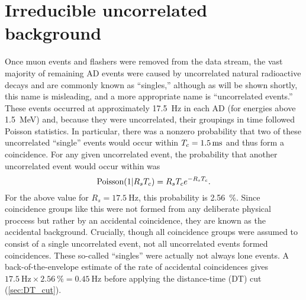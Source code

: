 
\section{Irreducible uncorrelated background}
\label{sec:acc}

Once muon events and flashers were removed from the data stream,
the vast majority of remaining AD events were caused by uncorrelated
natural radioactive decays and are commonly known as ``singles,''
although as will be shown shortly, this name is misleading,
and a more appropriate name is ``uncorrelated events.''
These events occurred at approximately \SI{17.5}{\hertz} in each AD
(for energies above \SI{1.5}{\MeV})
and,
because they were uncorrelated, their groupings in time followed Poisson statistics.
In particular, there was a nonzero probability that
two of these uncorrelated ``single'' events would occur within
$T_c=\SI{1.5}{\milli\second}$ and thus form a  coincidence.
For any given uncorrelated event, the probability that
another uncorrelated event would occur within \tc{} was
\begin{equation}
    \text{Poisson}(1\vert R_sT_c) = R_sT_c e^{-R_sT_c}.
\end{equation}
For the above value for $R_s=\SI{17.5}{\hertz}$, this probability is \SI{2.56}{\percent}.
Since  coincidence groups like this were not formed from any
deliberate physical proccess but rather by an accidental coincidence,
they are known as the accidental background.
Crucially, though all  coincidence groups
were assumed to consist of a single uncorrelated event,
not all uncorrelated events formed  coincidences.
These so-called ``singles'' were actually not always lone events.
A back-of-the-envelope estimate of the rate of accidental coincidences gives
$\SI{17.5}{\hertz}\times\SI{2.56}{\percent}=\SI{0.45}{\hertz}$
before applying the distance-time (DT) cut (\cref{sec:DT_cut}).

